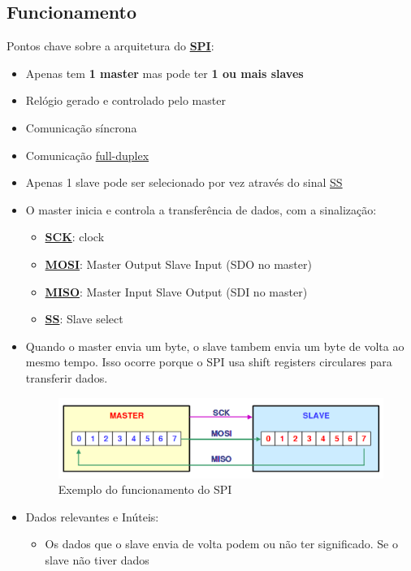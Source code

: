 \documentclass[a4paper, 12pt, onecolumn, twoside]{article}
\begin{document}
\subsection{Funcionamento}
Pontos chave sobre a arquitetura do \hyperref[spi]{\textbf{SPI}}:\@
\begin{itemize}
    \item Apenas tem \textbf{1 master} mas pode ter \textbf{1 ou mais slaves}
    \item Relógio gerado e controlado pelo master
    \item Comunicação síncrona
    \item Comunicação \hyperref[fullduplex]{full-duplex}
    \item Apenas 1 slave pode ser selecionado por vez através do sinal \hyperref[ss]{SS}
    \item O master inicia e controla a transferência de dados, com a sinalização:
    \begin{itemize}
        \item \hyperref[sck]{\large\textbf{{SCK}}}: clock
        \item \hyperref[mosi]{\large\textbf{{MOSI}}}: Master Output Slave Input (SDO no
        master)
        \item \hyperref[miso]{\large\textbf{{MISO}}}: Master Input Slave Output (SDI no
        master)
        \item \hyperref[ss]{\large\textbf{{SS}}}: Slave select
    \end{itemize} 
    \item Quando o master envia um byte, o slave tambem envia um byte de volta ao mesmo tempo.
    Isso ocorre porque o SPI usa shift registers circulares para transferir dados.
    \begin{figure}[h]
        \centering
        \includegraphics[width=1\textwidth]{Funcionamento_SPI.png}
        \caption{Exemplo do funcionamento do SPI}\label{fig1}
    \end{figure}
    \item Dados relevantes e Inúteis:
    \begin{itemize}
        \item Os dados que o slave envia de volta podem ou não ter significado. Se o slave não tiver dados 

\end{itemize}
\end{itemize}
\end{document}
